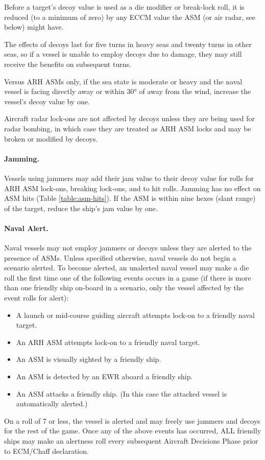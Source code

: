 Before a target's decoy value is used as a die modifier or break-lock roll, it is reduced (to a minimum of zero) by any ECCM value the ASM (or air radar, see below) might have.

The effects of decoys last for five turns in heavy seas and twenty turns in other seas, so if a vessel is unable to employ decoys due to damage, they may still receive the benefits on subsequent turns.

Versus ARH ASMs only, if the sea state is moderate or heavy and the naval vessel is facing directly away or within 30° of away from the wind, increase the vessel's decoy value by one.

Aircraft radar lock-ons are not affected by decoys unless they are being used for radar bombing, in which case they are treated as ARH ASM locks and may be broken or modified by decoys.

\paragraph{Jamming.}  Vessels using jammers may add their jam value to their decoy value for rolls for ARH ASM lock-ons, breaking lock-ons, and to hit rolls. Jamming has no effect on ASM hits (Table \ref{table:asm-hits}). If the ASM is within nine hexes (slant range) of the target, reduce the ship's jam value by one.


\paragraph{Naval Alert.}  Naval vessels may not employ jammers or decoys unless they are alerted to the presence of ASMs.  Unless specified otherwise, naval vessels do not begin a scenario alerted.  To become alerted, an unalerted naval vessel may make a die roll the first time one of the following events occurs in a game (if there is more than one friendly ship on-board in a scenario, only the vessel affected by the event rolls for alert):
\begin{itemize}
    \item A launch or mid-course guiding aircraft attempts lock-on to a friendly naval target.
    \item An ARH ASM attempts lock-on to a friendly naval target.
    \item An ASM is visually sighted by a friendly ship.
    \item An ASM is detected by an EWR aboard a friendly ship.
    \item An ASM attacks a friendly ship. (In this case the attacked vessel is automatically alerted.)
\end{itemize}
On a roll of 7 or less, the vessel is alerted and may freely use jammers and decoys for the rest of the game.  Once any of the above events has occurred, ALL friendly ships may make an alertness roll every subsequent Aircraft Decisions Phase prior to ECM/Chaff declaration.


